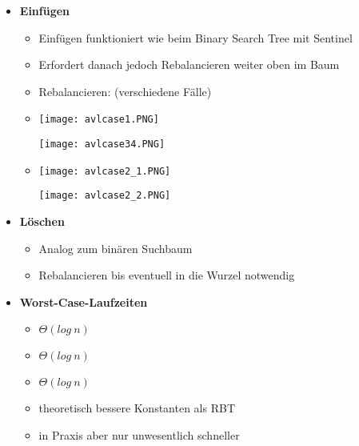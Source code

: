 \begin{itemize}
        \item \textbf{Einfügen}
            \begin{itemize}
                \item Einfügen funktioniert wie beim Binary Search Tree mit Sentinel
                \item Erfordert danach jedoch Rebalancieren weiter oben im Baum
                \item Rebalancieren: (verschiedene Fälle)
                \item[]
                    \begin{minipage}{0.45\textwidth}
                        \texttt{[image: avlcase1.PNG]}
                    \end{minipage}
                    \begin{minipage}{0.45\textwidth}
                        \texttt{[image: avlcase34.PNG]} 
                    \end{minipage}
                \item[]
                    \begin{minipage}{0.45\textwidth}
                        \texttt{[image: avlcase2\_1.PNG]}
                    \end{minipage}
                    \begin{minipage}{0.45\textwidth}
                        \texttt{[image: avlcase2\_2.PNG]}
                    \end{minipage}
            \end{itemize}

        \item \textbf{Löschen}
            \begin{itemize}
                \item Analog zum binären Suchbaum
                \item Rebalancieren bis eventuell in die Wurzel notwendig
            \end{itemize}

        \item \textbf{Worst-Case-Laufzeiten}
            \begin{itemize}
                \item {} $\Theta(log~n)$
                \item {} $\Theta(log~n)$
                \item {} $\Theta(log~n)$
                \item theoretisch bessere Konstanten als RBT
                \item in Praxis aber nur unwesentlich schneller
            \end{itemize}
            
    \end{itemize}

